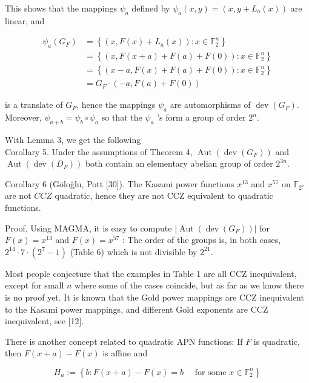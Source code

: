 \documentclass[10pt]{article}
\begin{document}
This shows that the mappings $\psi_{a}$ defined by $\psi_{a}(x, y)=\left(x, y+L_{a}(x)\right)$ are linear, and

$$
\begin{aligned}
\psi_{a}\left(G_{F}\right) & =\left\{\left(x, F(x)+L_{a}(x)\right): x \in \mathbb{F}_{2}^{n}\right\} \\
& =\left\{(x, F(x+a)+F(a)+F(0)): x \in \mathbb{F}_{2}^{n}\right\} \\
& =\left\{(x-a, F(x)+F(a)+F(0)): x \in \mathbb{F}_{2}^{n}\right\} \\
& =G_{F} \cdot(-a, F(a)+F(0))
\end{aligned}
$$

is a translate of $G_{F}$, hence the mappings $\psi_{a}$ are automorphisms of $\operatorname{dev}\left(G_{F}\right)$. Moreover, $\psi_{a+b}= \psi_{b} \circ \psi_{a}$ so that the $\psi_{a}$ 's form a group of order $2^{n}$.

With Lemma 3, we get the following\\
Corollary 5. Under the assumptions of Theorem 4, $\operatorname{Aut}\left(\operatorname{dev}\left(G_{F}\right)\right)$ and $\operatorname{Aut}\left(\operatorname{dev}\left(D_{F}\right)\right)$ both contain an elementary abelian group of order $2^{3 n}$.

Corollary 6 (Göloğlu, Pott [30]). The Kasami power functions $x^{13}$ and $x^{57}$ on $\mathbb{F}_{2^{7}}$ are not $C C Z$ quadratic, hence they are not CCZ equivalent to quadratic functions.

Proof. Using MAGMA, it is easy to compute $\left|\operatorname{Aut}\left(\operatorname{dev}\left(G_{F}\right)\right)\right|$ for $F(x)=x^{13}$ and $F(x)=x^{57}$ : The order of the groups is, in both cases, $2^{14} \cdot 7 \cdot\left(2^{7}-1\right)$ (Table 6) which is not divisible by $2^{21}$.

Most people conjecture that the examples in Table 1 are all CCZ inequivalent, except for small $n$ where some of the cases coincide, but as far as we know there is no proof yet. It is known that the Gold power mappings are CCZ inequivalent to the Kasami power mappings, and different Gold exponents are CCZ inequivalent, see [12].

There is another concept related to quadratic APN functions: If $F$ is quadratic, then $F(x+ a)-F(x)$ is affine and


\begin{equation*}
H_{a}:=\left\{b: F(x+a)-F(x)=b \quad \text { for some } x \in \mathbb{F}_{2}^{n}\right\} \tag{6}
\end{equation*}
\end{document}
